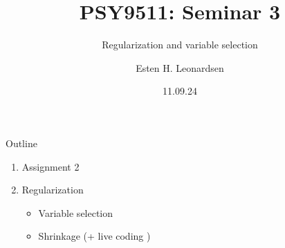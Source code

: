 \documentclass[8pt]{beamer}
\title{PSY9511: Seminar 3}
\subtitle{Regularization and variable selection}
\author{Esten H. Leonardsen}
\date{11.09.24}
\begin{document}
	\begin{frame}
	 	\maketitle
	\end{frame}

    \begin{frame}{Outline}
        \centering
        \vfill
        \begin{enumerate}
            \item Assignment 2
            \item Regularization
            \begin{itemize}
                \item Variable selection
                \item Shrinkage (+ live coding )
            \end{itemize}
        \end{enumerate}
        \vfill
    \end{frame}
\end{document}
